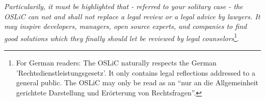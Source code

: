\textit{Particularily, it must be highlighted that - referred to your solitary
case - the OSLiC can not and shall not replace a legal review or a legal advice
by lawyers. It may inspire developers, managers, open source experts, and
companies to find good solutions which they finally should let be reviewed by
legal counselors}\footnote{For German readers: The OSLiC naturally respects the
German 'Rechtsdienstleistungsgesetz'. It only contains legal reflections
addressed to a general public. The OSLiC may only be read as an \enquote{nur an
die Allgemeinheit gerichtete Darstellung und Erörterung von Rechtsfragen}.}.



